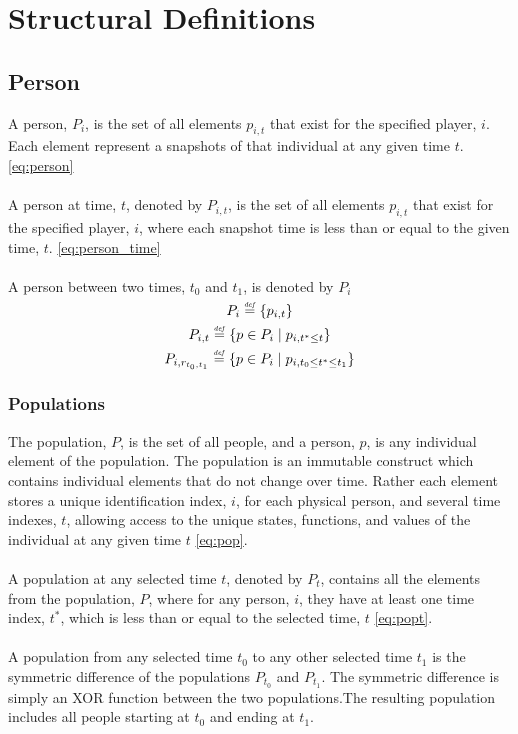 \documentclass[]{article}
\newcommand{\defeq}{\stackrel{\smash{\scriptscriptstyle\mathit{def}}}{=}}
\begin{document}
\section*{Structural Definitions}
\subsection*{Person}
A person, $P_{i}$, is the set of all elements $p_{i,t}$ that exist for the specified player, $i$. Each element represent a snapshots of that individual at any given time $t$. \eqref{eq:person}
\\
\\
A person at time, $t$, denoted by $P_{i,t}$, is the set of all elements $p_{i,t}$ that exist for the specified player, $i$, where each snapshot time is less than or equal to the given time, $t$. \eqref{eq:person_time}
\\
\\
A person between two times, $t_{0}$ and $t_{1}$, is denoted by $P_{i}$
%
\begin{equation} \label{eq:person} 
P_{i} \defeq \{ p_{i,t} \} 
\end{equation}
\begin{equation} \label{eq:person_time} 
P_{i,t} \defeq \{ p \in P_{i} \mid p_{i,t^{*} \leq t} \} 
\end{equation}
\begin{equation} \label{eq:person_time_range} 
P_{i,r_{t_{0},t_{1}}} \defeq \{ p \in P_{i} \mid p_{i,t_{0} \leq t^{*} \leq t_{1}} \} 
\end{equation}    
%
\subsubsection*{Populations}
The population, $P$, is the set of all people, and a person, $p$, is any individual element of the population. The population is an immutable construct which contains individual elements that do not change over time. Rather each element stores a unique identification index, $i$, for each physical person, and several time indexes, $t$, allowing access to the unique states, functions, and values of the individual at any given time $t$ \eqref{eq:pop}.
\\
\\
A population at any selected time $t$, denoted by $P_{t}$, contains all the elements from the population, $P$, where for any person, $i$, they have at least one time index, $t^{*}$, which is less than or equal to the selected time, $t$ \eqref{eq:popt}.  
\\
\\
A population from any selected time $t_{0}$ to any other selected time $t_{1}$ is the symmetric difference of the populations $P_{t_{0}}$ and $P_{t_{1}}$. The symmetric difference is simply an XOR function between the two populations.The resulting population includes all people starting at $t_{0}$ and ending at $t_{1}$.
% 
\end{document}
